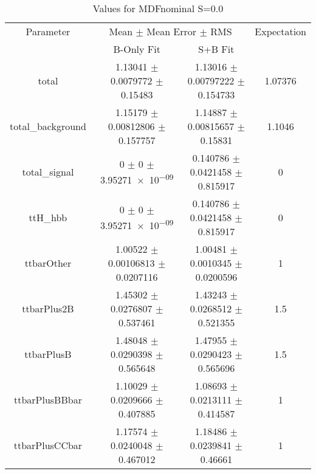 \begin{table}
\centering
\caption{Values for MDFnominal S=0.0}
\begin{tabular}{cccc}
\toprule
Parameter & \multicolumn{2}{c}{Mean $\pm$ Mean Error $\pm$ RMS} & Expectation\\
 & B-Only Fit & S+B Fit & \\
\midrule
total & \num{1.13041} $\pm$ \num{0.0079772} $\pm$ \num{0.15483} & \num{1.13016} $\pm$ \num{0.00797222} $\pm$ \num{0.154733} & \num{1.07376}\\
total\_background & \num{1.15179} $\pm$ \num{0.00812806} $\pm$ \num{0.157757} & \num{1.14887} $\pm$ \num{0.00815657} $\pm$ \num{0.15831} & \num{1.1046}\\
total\_signal & \num{0} $\pm$ \num{0} $\pm$ \num{3.95271e-09} & \num{0.140786} $\pm$ \num{0.0421458} $\pm$ \num{0.815917} & \num{0}\\
ttH\_hbb & \num{0} $\pm$ \num{0} $\pm$ \num{3.95271e-09} & \num{0.140786} $\pm$ \num{0.0421458} $\pm$ \num{0.815917} & \num{0}\\
ttbarOther & \num{1.00522} $\pm$ \num{0.00106813} $\pm$ \num{0.0207116} & \num{1.00481} $\pm$ \num{0.0010345} $\pm$ \num{0.0200596} & \num{1}\\
ttbarPlus2B & \num{1.45302} $\pm$ \num{0.0276807} $\pm$ \num{0.537461} & \num{1.43243} $\pm$ \num{0.0268512} $\pm$ \num{0.521355} & \num{1.5}\\
ttbarPlusB & \num{1.48048} $\pm$ \num{0.0290398} $\pm$ \num{0.565648} & \num{1.47955} $\pm$ \num{0.0290423} $\pm$ \num{0.565696} & \num{1.5}\\
ttbarPlusBBbar & \num{1.10029} $\pm$ \num{0.0209666} $\pm$ \num{0.407885} & \num{1.08693} $\pm$ \num{0.0213111} $\pm$ \num{0.414587} & \num{1}\\
ttbarPlusCCbar & \num{1.17574} $\pm$ \num{0.0240048} $\pm$ \num{0.467012} & \num{1.18486} $\pm$ \num{0.0239841} $\pm$ \num{0.46661} & \num{1}\\
\bottomrule
\end{tabular}
\end{table}